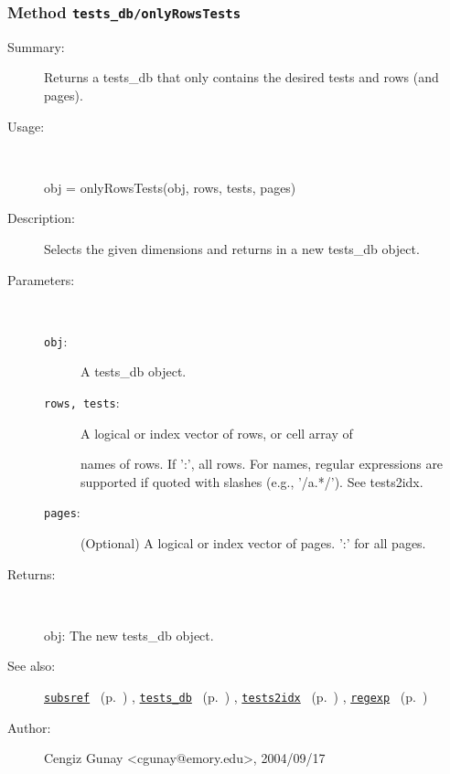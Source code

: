 \subsubsection[Method \texttt{onlyRowsTests}]{Method \texttt{tests\_db/onlyRowsTests}}%
%
\label{ref_tests_db__onlyRowsTests}%
\hypertarget{ref_tests_db__onlyRowsTests}{}%
\begin{description}
\item[Summary:]Returns a tests\_db that only contains the desired 
		tests and rows (and pages).
%
\item[Usage:]~%
\begin{lyxcode}%
obj = onlyRowsTests(obj, rows, tests, pages)
%
\end{lyxcode}%
%
\item[Description:]%
Selects the given dimensions and returns in a new tests\_db object.
\item[Parameters:]~
\begin{description}%
\item[\texttt{obj}:]
 A tests\_db object.
\item[\texttt{rows, tests}:]
 A logical or index vector of rows, or cell array of

names of rows. If ':', all rows. For names, regular expressions are
supported if quoted with slashes (e.g., '/a.*/'). See tests2idx.
\item[\texttt{pages}:]
 (Optional) A logical or index vector of pages. ':' for all pages.
\end{description}%
%
\item[Returns:
]~

	obj: The new tests\_db object.
%
%
\item[See also:]%
\hyperlink{ref_subsref}{\texttt{subsref}}%
\ (p.~\pageref{ref_subsref})%
%
, \hyperlink{ref_tests_db}{\texttt{tests\_db}}%
\ (p.~\pageref{ref_tests_db})%
%
, \hyperlink{ref_tests2idx}{\texttt{tests2idx}}%
\ (p.~\pageref{ref_tests2idx})%
%
, \hyperlink{ref_regexp}{\texttt{regexp}}%
\ (p.~\pageref{ref_regexp})%
%
%
\item[Author:]%
Cengiz Gunay <cgunay@emory.edu>, 2004/09/17
%
\end{description}
\methodline%
